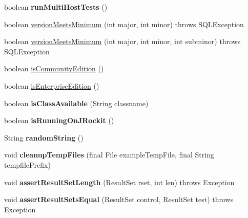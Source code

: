\begin{DoxyCompactItemize}
boolean {\bfseries run\+Multi\+Host\+Tests} ()
\item 
boolean \mbox{\hyperlink{classtestsuite_1_1_base_test_case_a4098e9a480c1907875ded976cdbc81a3}{version\+Meets\+Minimum}} (int major, int minor)  throws S\+Q\+L\+Exception 
\item 
boolean \mbox{\hyperlink{classtestsuite_1_1_base_test_case_a13e93e8347469a0c2e8dbf3be8795bb5}{version\+Meets\+Minimum}} (int major, int minor, int subminor)  throws S\+Q\+L\+Exception 
\item 
boolean \mbox{\hyperlink{classtestsuite_1_1_base_test_case_a30a8a94757291826321a07c5b10a6233}{is\+Community\+Edition}} ()
\item 
boolean \mbox{\hyperlink{classtestsuite_1_1_base_test_case_ae29a3a848b87638921a7078f572b3f83}{is\+Enterprise\+Edition}} ()
\item 
\mbox{\label{classtestsuite_1_1_base_test_case_af67350d0499d7649ea352fddd70b0be2}} 
boolean {\bfseries is\+Class\+Available} (String classname)
\item 
\mbox{\label{classtestsuite_1_1_base_test_case_aa78a5395ed790afc608520b5dc239552}} 
boolean {\bfseries is\+Running\+On\+J\+Rockit} ()
\item 
\mbox{\label{classtestsuite_1_1_base_test_case_ad7304f085aa6f697299a0a10fb1f0e4d}} 
String {\bfseries random\+String} ()
\item 
\mbox{\label{classtestsuite_1_1_base_test_case_a604f630b7961dd73826ab5416a076ec7}} 
void {\bfseries cleanup\+Temp\+Files} (final File example\+Temp\+File, final String tempfile\+Prefix)
\item 
\mbox{\label{classtestsuite_1_1_base_test_case_aa23dd720e89199dbafdc084069ed2ef3}} 
void {\bfseries assert\+Result\+Set\+Length} (Result\+Set rset, int len)  throws Exception 
\item 
\mbox{\label{classtestsuite_1_1_base_test_case_a9610d1a24e717741f2ec5cd310361d45}} 
void {\bfseries assert\+Result\+Sets\+Equal} (Result\+Set control, Result\+Set test)  throws Exception 
\item 

\end{DoxyCompactItemize}

